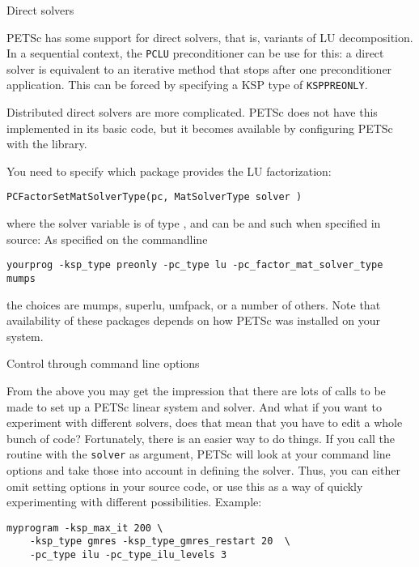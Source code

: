  {Direct solvers}
\label{sec:petsc-direct}

PETSc has some support for direct solvers, that is, variants of LU
decomposition. In a sequential context, the \lstinline{PCLU}
preconditioner can be use for this: a direct solver is equivalent to
an iterative method that stops after one preconditioner
application. This can be forced by specifying a KSP type of
\lstinline{KSPPREONLY}.

Distributed direct solvers are more complicated. PETSc does not have
this implemented in its basic code, but it becomes available by
configuring PETSc with the
 library.

You need to specify which package provides the LU factorization:

\begin{lstlisting}
PCFactorSetMatSolverType(pc, MatSolverType solver )
\end{lstlisting}

where the solver variable is of type ,
and can be  and such when specified in source:
%
%
As specified on the commandline
\begin{verbatim}
yourprog -ksp_type preonly -pc_type lu -pc_factor_mat_solver_type mumps
\end{verbatim}
the choices are mumps, superlu, umfpack, or a number of
others. 
Note that availability of these packages depends on how PETSc
was installed on your system.

 {Control through command line options}

From the above you may get the impression that there are lots of calls
to be made to set up a PETSc linear system and solver. And what if you
want to experiment with different solvers, does that mean that you
have to edit a whole bunch of code? Fortunately, there is an easier
way to do things. If you call the routine
%
with the \lstinline{solver} as argument,
%
PETSc will look at your command line options and take those into
account in defining the solver. Thus, you can either omit setting
options in your source code, or use this as a way of quickly
experimenting with different possibilities. Example:

\begin{verbatim}
myprogram -ksp_max_it 200 \
    -ksp_type gmres -ksp_type_gmres_restart 20  \
    -pc_type ilu -pc_type_ilu_levels 3
\end{verbatim}

